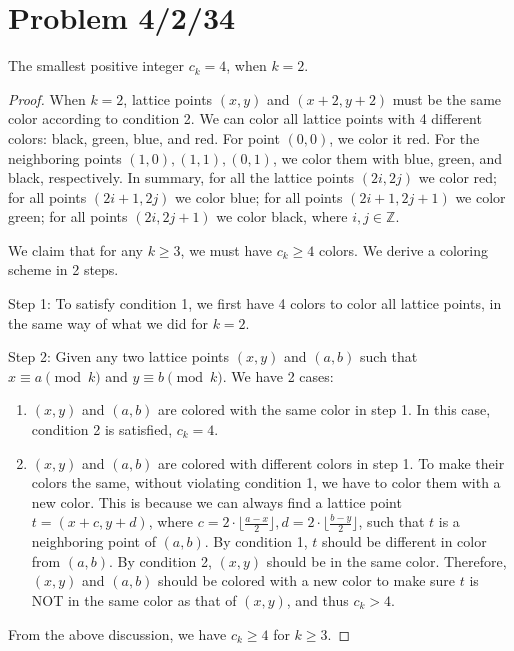 \documentclass[11pt, oneside]{article}   	%
\begin{document}
 \newpage
 \section{Problem 4/2/34}


The smallest positive integer $c_k=4$, when $k=2$.
\begin{proof}

When $k=2$, lattice points $(x, y)$ and $(x+2, y+2)$ must be the same color according to condition 2. We can color all lattice points with 4 different colors: black, green, blue, and red. For point $(0, 0)$, we color it red. For the neighboring points $(1, 0), (1, 1), (0, 1)$, we color them with blue, green, and black, respectively. In summary, for all the lattice points $(2i, 2j)$ we color red; for all points $(2i+1, 2j)$ we color blue; for all points $(2i+1, 2j+1)$ we color green; for all points $(2i, 2j+1)$ we color black, where $i, j \in \mathbb{Z}$.

We claim that for any $k\ge 3$, we must have $c_k\ge 4$ colors. We derive a coloring scheme in 2 steps.

Step 1: To satisfy condition 1, we first have 4 colors to color all lattice points,  in the same way of what we did for $k=2$. 

Step 2: Given any two lattice points $(x, y)$ and $(a, b)$ such that $x\equiv a \pmod k$ and $y\equiv b \pmod k$.  We have 2 cases: 
\begin{enumerate}
\item $(x, y)$ and $(a, b)$  are colored with the same color in step 1. In this case, condition 2 is satisfied, $c_k=4$.

\item $(x, y)$ and $(a, b)$ are colored with different colors in step 1. To make their colors the same, without violating condition 1, we have to color them with a new color. This is because we can always find a lattice point $t = (x+c, y+d)$, where $c=2\cdot \lfloor\frac{a-x}{2}\rfloor, d=2\cdot \lfloor\frac{b-y}{2}\rfloor$, such that $t$ is a neighboring point of $(a, b)$. By condition 1, $t$ should be different in color from $(a, b)$. By condition 2, $(x, y)$ should be in the same color. Therefore, $(x, y)$ and $(a, b)$ should be colored with a new color to make sure $t$ is NOT in the same color as that of $(x,y)$, and thus $c_k> 4$. 


\end{enumerate}

From the above discussion, we have $c_k\ge 4$ for $k\ge 3$.





\end{proof}
\end{document}
